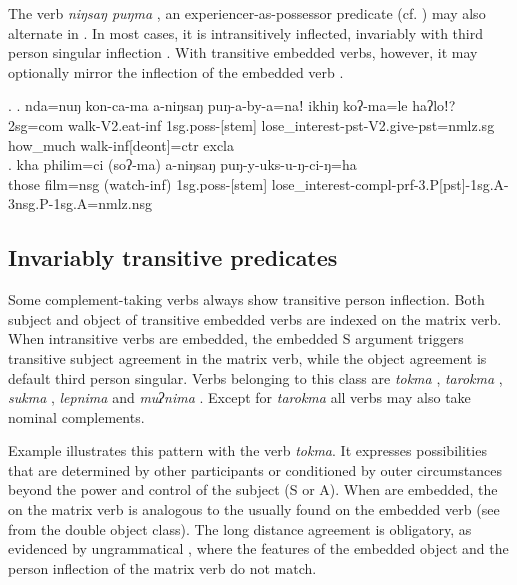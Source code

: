 The  verb \emph{niŋsaŋ puŋma} , an experiencer-as-possessor predicate (cf. ) may also alternate in . In most cases, it is intransitively inflected, invariably with third person singular inflection \Next[a]. With transitive embedded verbs, however, it may optionally mirror the inflection of the embedded verb  \Next[b]. 

\ex. \ag. nda=nuŋ kon-ca-ma a-niŋsaŋ puŋ-a-by-a=naǃ ikhiŋ koʔ-ma=le haʔloǃ? \\
	{\sc 2sg=com} walk{\sc -V2.eat-inf} {\sc 1sg.poss-[stem]}  lose\_interest{\sc [3sg]-pst-V2.give-pst=nmlz.sg} how\_much walk{\sc -inf[deont]=ctr}  {\sc excla}\\
	\bg. kha philim=ci (soʔ-ma) a-niŋsaŋ puŋ-y-uks-u-ŋ-ci-ŋ=ha\\
		{\sc those} film{\sc =nsg} (watch{\sc -inf}) {\sc 1sg.poss-[stem]} lose\_interest{\sc -compl-prf-3.P[pst]-1sg.A-3nsg.P-1sg.A=nmlz.nsg}	\\
 


\subsection{Invariably transitive predicates}

Some complement-taking verbs always show transitive person inflection. Both subject and object of transitive embedded verbs are indexed on the matrix verb. When intransitive verbs are embedded, the embedded S argument triggers transitive subject agreement in the matrix verb, while the object agreement is default third person singular. Verbs belonging to this class are  \emph{tokma} , \emph{tarokma} , \emph{sukma} ,  \emph{lepnima}  and \emph{muʔnima} . Except for \emph{tarokma} all verbs may also take nominal complements. 

Example \Next illustrates this pattern with the verb \emph{tokma}. It expresses possibilities that are determined by other participants or conditioned by outer circumstances beyond the power and control of the subject (S or A). When  are embedded,  the  on the matrix verb is analogous to the  usually found on  the embedded verb (see \Next[b] from the double object class). The long distance agreement is obligatory, as evidenced by ungrammatical \Next[c], where the  features of the embedded object and the person inflection of the matrix verb do not match. 

